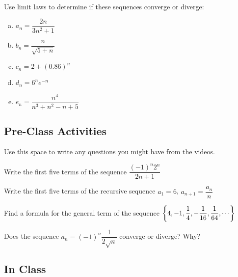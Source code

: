 \documentclass[notes]{subfiles}
\begin{document}
		\begin{ex}
			Use limit laws to determine if these sequences converge or diverge:
			\begin{enumerate}[(a)]
				\item $a_n = \dfrac{2n}{3n^2 + 1}$
					
				\item $b_n = \dfrac{n}{\sqrt{5 + n}}$
					
				\item $c_n = 2+ (0.86)^n$
				
				\item $d_n = 6^ne^{-n}$
					
				\item $e_n = \dfrac{n^4}{n^3 + n^2 -n + 5}$
			\end{enumerate}
		\end{ex}
			\newpage
		
	\subsection*{Pre-Class Activities}
		\begin{ex}
			Use this space to write any questions you might have from the videos.
		\end{ex}	
			\vs{.5}
			
		\begin{ex}
			Write the first five terms of the sequence $\dfrac{(-1)^n2^n}{2n+1}$
		\end{ex}
			\vs{1}
			
		\begin{ex}
			Write the first five terms of the recursive sequence $a_1 = 6$, $a_{n+1} = \dfrac{a_n}{n}$
		\end{ex}
			\vs{1}
			
		\begin{ex}
			Find a formula for the general term of the sequence $\lrbrace{4,-1,\dfrac{1}{4},-\dfrac{1}{16},\dfrac{1}{64},\cdots}$
		\end{ex}	
			\vs{1}
			
		\begin{ex}
			Does the sequence $a_n = (-1)^n \dfrac{1}{2\sqrt{n}}$ converge or diverge?  Why?
		\end{ex}
			\vs{1}
			\newpage
			
	\subsection*{In Class}
\end{document}

